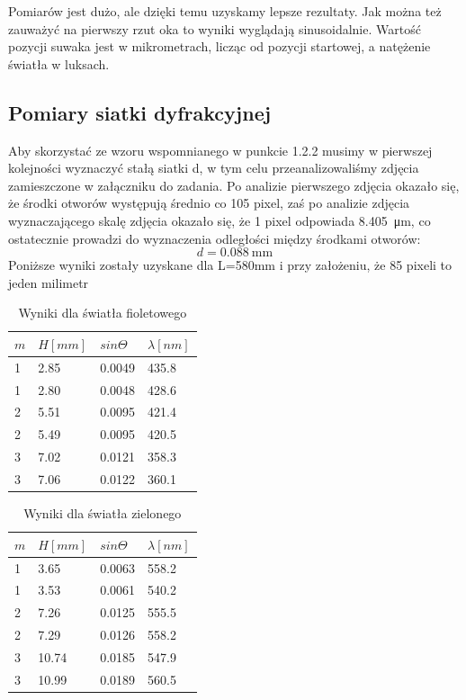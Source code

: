 \documentclass{article}
\begin{document}
Pomiarów jest dużo, ale dzięki temu uzyskamy lepsze rezultaty. Jak można też zauważyć na pierwszy rzut oka to wyniki wyglądają sinusoidalnie. Wartość pozycji suwaka jest w mikrometrach, licząc od pozycji startowej, a natężenie światła w luksach.
\subsection{Pomiary siatki dyfrakcyjnej}
Aby skorzystać ze wzoru wspomnianego w punkcie 1.2.2 musimy w pierwszej kolejności wyznaczyć stałą siatki d, w tym celu przeanalizowaliśmy zdjęcia zamieszczone w załączniku do zadania. Po analizie pierwszego zdjęcia okazało się, że środki otworów występują średnio co 105 pixel, zaś po analizie zdjęcia wyznaczającego skalę zdjęcia okazało się, że 1 pixel odpowiada \SI{8,405}{\micro\metre}, co ostatecznie prowadzi do wyznaczenia odległości między środkami otworów:
\begin{equation}
    d=\SI{0.088}{\milli\metre}
\end{equation}
Poniższe wyniki zostały uzyskane dla L=580mm i przy założeniu, że 85 pixeli to jeden milimetr
\begin{table}[h!]
\centering
\begin{tabular}{|l|l|l|l|}
\hline
$m$ & $H[mm]$ & $sin\Theta$ & $\lambda[nm]$ \\ \hline
1 & 2.85 & 0.0049 & 435.8 \\
1 & 2.80 & 0.0048 & 428.6 \\
2 & 5.51 & 0.0095 & 421.4 \\
2 & 5.49 & 0.0095 & 420.5 \\
3 & 7.02 & 0.0121 & 358.3 \\
3 & 7.06 & 0.0122 & 360.1 \\
\hline
\end{tabular}
\caption{Wyniki dla światła fioletowego}
\end{table}
\begin{table}[h!]
\centering
\begin{tabular}{|l|l|l|l|}
\hline
$m$ & $H[mm]$ & $sin\Theta$ & $\lambda[nm]$ \\ \hline
1 & 3.65 & 0.0063 & 558.2 \\
1 & 3.53 & 0.0061 & 540.2 \\
2 & 7.26 & 0.0125 & 555.5 \\
2 & 7.29 & 0.0126 & 558.2 \\
3 & 10.74 & 0.0185 & 547.9 \\
3 & 10.99 & 0.0189 & 560.5 \\
\hline
\end{tabular}
\caption{Wyniki dla światła zielonego}
\end{table}
\end{document}
